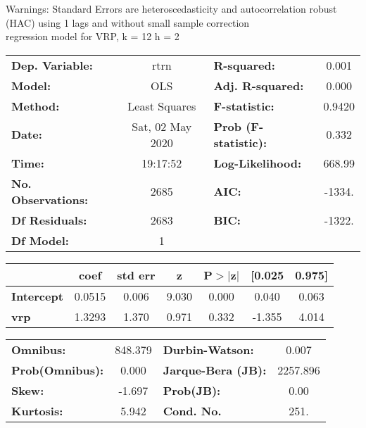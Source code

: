Warnings: \newline
 [1] Standard Errors are heteroscedasticity and autocorrelation robust (HAC) using 1 lags and without small sample correction\\ 

regression model for VRP, k = 12 h = 2\begin{center}
\begin{tabular}{lclc}
\toprule
\textbf{Dep. Variable:}    &       rtrn       & \textbf{  R-squared:         } &     0.001   \\
\textbf{Model:}            &       OLS        & \textbf{  Adj. R-squared:    } &     0.000   \\
\textbf{Method:}           &  Least Squares   & \textbf{  F-statistic:       } &    0.9420   \\
\textbf{Date:}             & Sat, 02 May 2020 & \textbf{  Prob (F-statistic):} &    0.332    \\
\textbf{Time:}             &     19:17:52     & \textbf{  Log-Likelihood:    } &    668.99   \\
\textbf{No. Observations:} &        2685      & \textbf{  AIC:               } &    -1334.   \\
\textbf{Df Residuals:}     &        2683      & \textbf{  BIC:               } &    -1322.   \\
\textbf{Df Model:}         &           1      & \textbf{                     } &             \\
\bottomrule
\end{tabular}
\begin{tabular}{lcccccc}
                   & \textbf{coef} & \textbf{std err} & \textbf{z} & \textbf{P$> |$z$|$} & \textbf{[0.025} & \textbf{0.975]}  \\
\midrule
\textbf{Intercept} &       0.0515  &        0.006     &     9.030  &         0.000        &        0.040    &        0.063     \\
\textbf{vrp}       &       1.3293  &        1.370     &     0.971  &         0.332        &       -1.355    &        4.014     \\
\bottomrule
\end{tabular}
\begin{tabular}{lclc}
\textbf{Omnibus:}       & 848.379 & \textbf{  Durbin-Watson:     } &    0.007  \\
\textbf{Prob(Omnibus):} &   0.000 & \textbf{  Jarque-Bera (JB):  } & 2257.896  \\
\textbf{Skew:}          &  -1.697 & \textbf{  Prob(JB):          } &     0.00  \\
\textbf{Kurtosis:}      &   5.942 & \textbf{  Cond. No.          } &     251.  \\
\bottomrule
\end{tabular}
\end{center}

